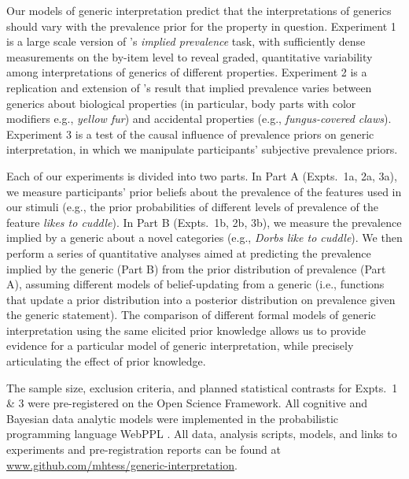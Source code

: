 \documentclass[floatsintext,doc]{apa6}
\begin{document}
Our models of generic interpretation predict that the interpretations of generics should vary with the prevalence prior for the property in question.
Experiment 1 is a large scale version of 's \emph{implied prevalence} task, with sufficiently dense measurements on the by-item level to reveal graded, quantitative variability among interpretations of generics of different properties. 
Experiment 2 is a replication and extension of 's result that implied prevalence varies between generics about biological properties (in particular, body parts with color modifiers e.g., \emph{yellow fur}) and accidental properties (e.g., \emph{fungus-covered claws}).
Experiment 3 is a test of the causal influence of prevalence priors on generic interpretation, in which we manipulate participants' subjective prevalence priors.

Each of our experiments is divided into two parts. 
In Part A (Expts.~1a, 2a, 3a), we measure participants' prior beliefs about the prevalence of the features used in our stimuli (e.g., the prior probabilities of different levels of prevalence of the feature \emph{likes to cuddle}). %
In Part B (Expts.~1b, 2b, 3b), we measure the prevalence implied by a generic about a novel categories (e.g., \emph{Dorbs like to cuddle}). 
We then perform a series of quantitative analyses aimed at predicting the prevalence implied by the generic (Part B) from the prior distribution of prevalence (Part A), assuming different models of belief-updating from a generic (i.e., functions that update a prior distribution into a posterior distribution on prevalence given the generic statement). 
The comparison of different formal models of generic interpretation using the same elicited prior knowledge allows us to provide evidence for a particular model of generic interpretation, while precisely articulating the effect of prior knowledge. 

The sample size, exclusion criteria, and planned statistical contrasts for Expts.~1 \& 3 were pre-registered on the Open Science Framework.
All cognitive and Bayesian data analytic models were implemented in the probabilistic programming language WebPPL \cite{dippl}. 
All data, analysis scripts, models, and links to experiments and pre-registration reports can be found at \url{www.github.com/mhtess/generic-interpretation}.
\end{document}
